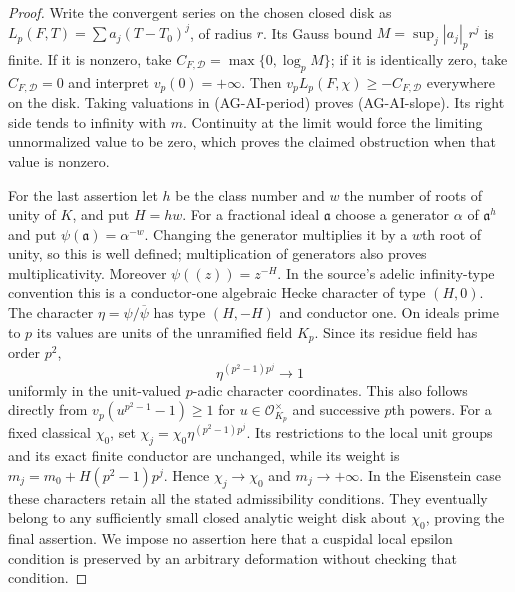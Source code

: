 \begin{proof}
Write the convergent series on the chosen closed disk as
$L_p(F,T)=\sum a_j(T-T_0)^j$, of radius $r$.  Its Gauss bound
$M=\sup_j|a_j|_p r^j$ is finite.  If it is nonzero, take
$C_{F,\mathcal D}=\max\{0,\log_p M\}$; if it is identically zero,
take $C_{F,\mathcal D}=0$ and interpret $v_p(0)=+\infty$.
Then $v_pL_p(F,\chi)\geq-C_{F,\mathcal D}$ everywhere on the
disk.  Taking valuations in (AG-AI-period) proves (AG-AI-slope).
Its right side tends to infinity with $m$.  Continuity at the
limit would force the limiting unnormalized value to be zero,
which proves the claimed obstruction when that value is nonzero.

For the last assertion let $h$ be the class number and $w$ the
number of roots of unity of $K$, and put $H=hw$.  For a fractional
ideal $\mathfrak a$ choose a generator $\alpha$ of $\mathfrak a^h$
and put $\psi(\mathfrak a)=\alpha^{-w}$.  Changing the generator
multiplies it by a $w$th root of unity, so this is well defined;
multiplication of generators also proves multiplicativity.
Moreover $\psi((z))=z^{-H}$.  In the source's adelic infinity-type
convention this is a conductor-one algebraic Hecke character of
type $(H,0)$.  The character
$\eta=\psi/\overline\psi$ has type $(H,-H)$ and conductor one.
On ideals prime to $p$ its values are units of the unramified field
$K_p$.  Since its residue field has order $p^2$,
\[
      \eta^{(p^2-1)p^j}\longrightarrow1
\]
uniformly in the unit-valued $p$-adic character coordinates.  This
also follows directly from $v_p(u^{p^2-1}-1)\geq1$ for
$u\in\mathcal O_{K_p}^{\times}$ and successive $p$th powers.
For a fixed classical $\chi_0$, set
$\chi_j=\chi_0\eta^{(p^2-1)p^j}$.  Its restrictions to the local unit groups and its exact
finite conductor are unchanged, while its weight is
$m_j=m_0+H(p^2-1)p^j$.  Hence $\chi_j\to\chi_0$ and
$m_j\to+\infty$.  In the Eisenstein case these characters retain
all the stated admissibility conditions.  They eventually belong
to any sufficiently small closed analytic weight disk about
$\chi_0$, proving the final assertion.  We impose no assertion here
that a cuspidal local epsilon condition is preserved by an
arbitrary deformation without checking that condition.
\end{proof}

